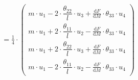\begin{align*}
	\\
	&= \frac{1}{4}\cdot \begin{pmatrix}
		m\cdot u_1 - 2\cdot \dfrac{\theta_{22}}{l} \cdot u_3 + \frac{\text{d}F}{\text{d}M} \cdot \theta_{33} \cdot u_4 
		\\
		m\cdot u_1 + 2\cdot \dfrac{\theta_{11}}{l} \cdot u_2 - \frac{\text{d}F}{\text{d}M} \cdot \theta_{33} \cdot u_4
		\\
		m\cdot u_1 + 2\cdot \dfrac{\theta_{22}}{l} \cdot u_3 + \frac{\text{d}F}{\text{d}M} \cdot \theta_{33} \cdot u_4
		\\
		m\cdot u_1 - 2\cdot \dfrac{\theta_{11}}{l} \cdot u_2 - \frac{\text{d}F}{\text{d}M} \cdot \theta_{33} \cdot u_4
	\end{pmatrix} 
\end{align*}

\clearpage